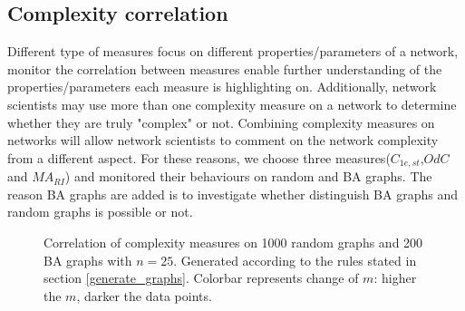 \documentclass[12pt]{article}
\begin{document}
\subsection{Complexity correlation}
Different type of measures focus on different properties/parameters of a network, monitor the correlation between measures enable further understanding of the properties/parameters each measure is highlighting on. Additionally, network scientists may use more than one complexity measure on a network to determine whether they are truly "complex" or not. Combining complexity measures on networks will allow network scientists to comment on the network complexity from a different aspect. For these reasons, we choose three measures($C_{1e,st}$,$OdC$ and $MA_{RI}$) and monitored their behaviours on random and BA graphs. The reason BA graphs are added is to investigate whether distinguish BA graphs and random graphs is possible or not.\\
\begin{figure}[h!]
    \caption{Correlation of complexity measures on 1000 random graphs and 200 BA graphs with $n=25$. Generated according to the rules stated in section \ref{generate_graphs}. Colorbar represents change of $m$: higher the $m$, darker the data points.}
    \label{fig:correlation}
\end{figure}
\end{document}
